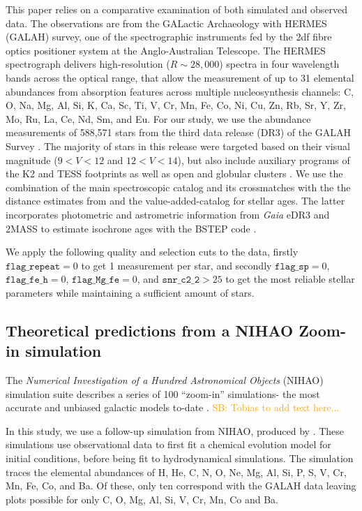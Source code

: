 \documentclass[fleqn,usenatbib]{mnras}
\newcommand{\SB}[1]{{\textcolor{orange}{SB: #1}}}
\newcommand{\Gaia}{\textit{Gaia}\xspace} %
\begin{document}
This paper relies on a comparative examination of both simulated and observed data. The observations are from the GALactic Archaeology with HERMES (GALAH) survey, one of the spectrographic instruments fed by the 2df fibre optics positioner system at the Anglo-Australian Telescope. The HERMES spectrograph delivers high-resolution ($R \sim 28,000$) spectra in four wavelength bands across the optical range, that allow the measurement of up to 31 elemental abundances from absorption features across multiple nucleosynthesis channels: C, O, Na, Mg, Al, Si, K, Ca, Sc, Ti, V, Cr, Mn, Fe, Co, Ni, Cu, Zn, Rb, Sr, Y, Zr, Mo, Ru, La, Ce, Nd, Sm, and Eu. For our study, we use the abundance measurements of 588,571 stars from the third data release (DR3) of the GALAH Survey \citep{Buder2021}. The majority of stars in this release were targeted based on their visual magnitude ($9 < V < 12$ and $12 < V < 14$), but also include auxiliary programs of the K2 and TESS footprints as well as open and globular clusters \cite[for more details see][]{Buder2021}. We use the combination of the main spectroscopic catalog and its crossmatches with the the distance estimates from \citet{BailerJones2021} and the value-added-catalog for stellar ages. The latter incorporates photometric and astrometric information from \Gaia eDR3 and 2MASS to estimate isochrone ages with the BSTEP code \citep{Sharma2018}.

We apply the following quality and selection cuts to the data, firstly $\texttt{flag\_repeat} = 0$ to get 1 measurement per star, and secondly $\texttt{flag\_sp} = 0$, $\texttt{flag\_fe\_h} = 0$, $\texttt{flag\_Mg\_fe} = 0$, and $\texttt{snr\_c2\_2} > 25$ to get the most reliable stellar parameters while maintaining a sufficient amount of stars.

\subsection{Theoretical predictions from a NIHAO Zoom-in simulation}\label{sec:sim_data}

The \textit{Numerical Investigation of a Hundred Astronomical Objects} (NIHAO) simulation suite describes a series of 100 “zoom-in” simulations- the most accurate and unbiased galactic models to-date \citep{Wang2015}. \SB{Tobias to add text here...}

In this study, we use a follow-up simulation from NIHAO, produced by \citet{Buck2021}. These simulations use observational data to first fit a chemical evolution model for initial conditions, before being fit to hydrodynamical simulations. The simulation traces the elemental abundances of H, He, C, N, O, Ne, Mg, Al, Si, P, S, V, Cr, Mn, Fe, Co, and Ba. Of these, only ten correspond with the GALAH data leaving plots possible for only C, O, Mg, Al, Si, V, Cr, Mn, Co and Ba.
\end{document}
